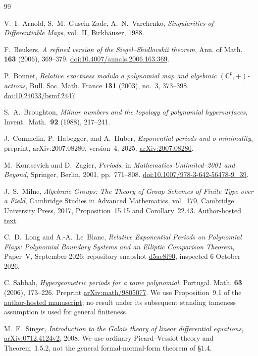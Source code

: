 \documentclass[11pt]{article}
\numberwithin{equation}{section}
\theoremstyle{definition}
\theoremstyle{remark}
\begin{document}
\small
\begin{thebibliography}{99}

 V.~I.~Arnold, S.~M.~Gusein-Zade, A.~N.~Varchenko,
 \emph{Singularities of Differentiable Maps}, vol.~II, Birkh\"auser, 1988.

 F.~Beukers,
 \emph{A refined version of the Siegel--Shidlovskii theorem}, Ann. of Math.
 \textbf{163} (2006), 369--379.
 \href{https://doi.org/10.4007/annals.2006.163.369}{doi:10.4007/annals.2006.163.369}.

 P.~Bonnet,
 \emph{Relative exactness modulo a polynomial map and algebraic
 $(\mathbb C^p,+)$-actions}, Bull. Soc. Math. France \textbf{131} (2003),
 no.~3, 373--398. \href{https://doi.org/10.24033/bsmf.2447}{doi:10.24033/bsmf.2447}.

 S.~A.~Broughton, \emph{Milnor numbers and the topology of
 polynomial hypersurfaces}, Invent.\ Math.\ \textbf{92} (1988), 217--241.

J.~Commelin, P.~Habegger, and A.~Huber,
\emph{Exponential periods and o-minimality},
preprint, arXiv:2007.08280, version~4, 2025.
\href{https://arxiv.org/abs/2007.08280}{arXiv:2007.08280}.

M.~Kontsevich and D.~Zagier,
\emph{Periods},
in \emph{Mathematics Unlimited--2001 and Beyond},
Springer, Berlin, 2001, pp.~771--808.
\href{https://doi.org/10.1007/978-3-642-56478-9_39}{doi:10.1007/978-3-642-56478-9\_39}.

J.~S.~Milne,
\emph{Algebraic Groups: The Theory of Group Schemes of Finite Type
 over a Field}, Cambridge Studies in Advanced Mathematics, vol.~170,
Cambridge University Press, 2017, Proposition~15.15 and Corollary~22.43.
\href{https://www.jmilne.org/math/Books/iAG2017.pdf}{Author-hosted text}.

 C.~D.~Long and A.-A.~Le~Blanc,
 \emph{Relative Exponential Periods on Polynomial Flags:
 Polynomial Boundary Systems and an Elliptic Comparison Theorem},
 Paper~V, September 2026; repository snapshot
 \href{https://github.com/long-mathematics/exponential-integral-theorem/tree/d5ae8f9081c7bc34d1622316bd8463482f244395}{d5ae8f90},
 inspected 6 October 2026.

C. Sabbah, \emph{Hypergeometric periods for a tame polynomial},
Portugal. Math. \textbf{63} (2006), 173--226.
Preprint \href{https://arxiv.org/abs/math/9805077}{arXiv:math/9805077}.
We use Proposition~9.1 of the
\href{https://perso.pages.math.cnrs.fr/users/claude.sabbah/articles/sabbah_bbases.pdf}{author-hosted manuscript};
no result under its subsequent standing tameness assumption is used
for general finiteness.

 M.~F.~Singer,
 \emph{Introduction to the Galois theory of linear differential equations},
 \href{https://arxiv.org/abs/0712.4124}{arXiv:0712.4124v2}, 2008.
 We use ordinary Picard--Vessiot theory and Theorem~1.5.2, not the
 general formal-normal-form theorem of \S1.4.

\end{thebibliography}
\end{document}
